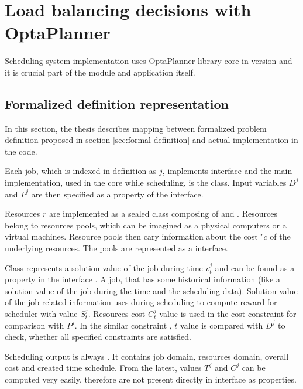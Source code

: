 \section{Load balancing decisions with OptaPlanner}\label{sec:load-balancing-optaplanner}

Scheduling system implementation uses OptaPlanner library core in version \cite{optaplannerDoc}
and it is crucial part of the  module and application itself.

\subsection{Formalized definition representation}\label{subsec:formalized-definition-representation}
In this section,
the thesis describes mapping between formalized problem definition proposed in section \ref{sec:formal-definition}
and actual implementation in the code.

Each job, which is indexed in definition as $j$,
implements  interface 
and the main implementation, used in the core while scheduling, is the  class.
Input variables $D^{j}$ and $P^{j}$ are then specified as a  property of the  interface.

Resources $r$ are implemented as a sealed class  composing of  
and .
Resources belong to resources pools,
which can be imagined as a physical computers or a virtual machines.
Resource pools then cary information about the cost ${}^{r}c$ of the underlying resources.
The pools are represented as a  interface.

Class  represents a solution value of the job during time $v_{t}^{j}$
and can be found as a property in the interface .
A job, 
that has some historical information (like a solution value of the job during the time and the scheduling data).
Solution value of the job related information uses  during scheduling to compute reward for scheduler with value $S_{t}^{j}$.
Resources cost $C_{t}^{j}$ value is used in the cost constraint  for comparison with $P^{j}$.
In the similar constraint , $t$ value is compared with $D^{j}$ to check,
whether all specified constraints are satisfied.

Scheduling output is always .
It contains job domain, resources domain, overall cost
and created time schedule.
From the latest, 
values $T^{j}$ and $C^{j}$ can be computed very easily,
therefore are not present directly in interface as properties.

